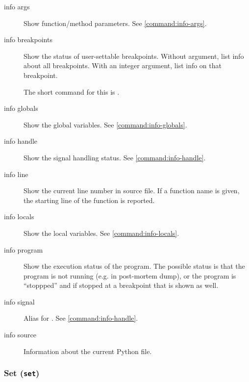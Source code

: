 \begin{description}

\item[info args]

Show function/method parameters. See \ref{command:info-args}.

\item[info breakpoints]

Show the status of user-settable breakpoints.  Without argument, list
info about all breakpoints.  With an integer argument, list info on
that breakpoint.

The short command for this is .

\item[info globals]

Show the global variables. See \ref{command:info-globals}. 

\item[info handle]

Show the signal handling status. See \ref{command:info-handle}. 

\item[info line]

Show the current line number in source file. If a function name is
given, the starting line of the function is reported.

\item[info locals]

Show the local variables. See \ref{command:info-locals}. 

\item[info program]

Show the execution status of the program. The possible status is that
the program is not running (e.g. in post-mortem dump), or the program is
``stoppped'' and if stopped at a breakpoint that is shown as well.

\item[info signal]

Alias for . See \ref{command:info-handle}. 

\item[info source]

Information about the current Python file.

\end{description}

\subsubsection{Set ({\tt set})\label{subsubsection-set}}

